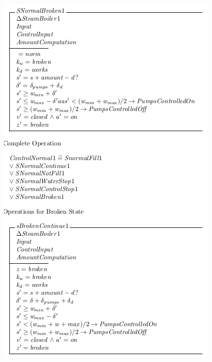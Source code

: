 \begin{center}
    \noindent \includegraphics[scale=0.8]{examples/steamboiler/0i.png}
\end{center}

